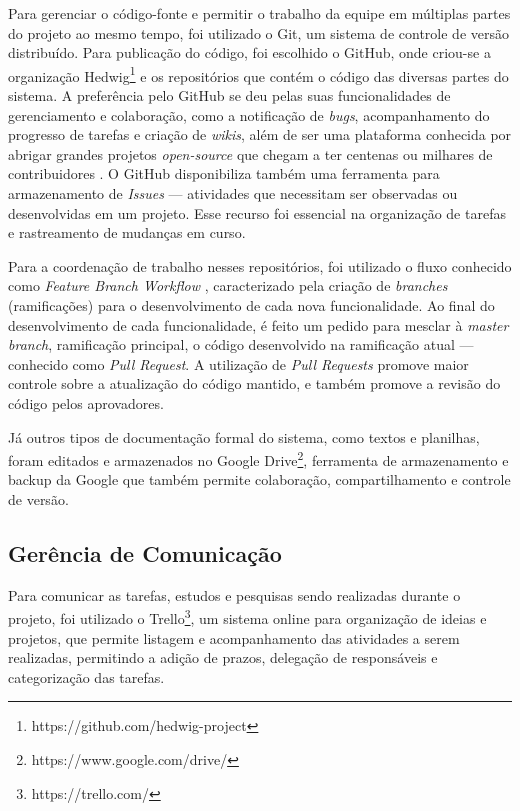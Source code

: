 Para gerenciar o código-fonte e permitir o trabalho da equipe em múltiplas partes do projeto ao mesmo tempo, foi utilizado o Git, um sistema de controle de versão distribuído. Para publicação do código, foi escolhido o GitHub, onde criou-se a organização Hedwig\footnote{https://github.com/hedwig-project} e os repositórios que contém o código das diversas partes do sistema. A preferência pelo GitHub se deu pelas suas funcionalidades de gerenciamento e colaboração, como a notificação de \emph{bugs}, acompanhamento do progresso de tarefas e criação de \textit{wikis}, além de ser uma plataforma conhecida por abrigar grandes projetos \emph{open-source} que chegam a ter centenas ou milhares de contribuidores \cite{github}. O GitHub disponibiliza também uma ferramenta para armazenamento de \emph{Issues} --- atividades que necessitam ser observadas ou desenvolvidas em um projeto. Esse recurso foi essencial na organização de tarefas e rastreamento de mudanças em curso.

Para a coordenação de trabalho nesses repositórios, foi utilizado o fluxo conhecido como \textit{Feature Branch Workflow} \cite{atlassian}, caracterizado pela criação de \textit{branches} (ramificações) para o desenvolvimento de cada nova funcionalidade. Ao final do desenvolvimento de cada funcionalidade, é feito um pedido para mesclar à \textit{master branch}, ramificação principal, o código desenvolvido na ramificação atual --- conhecido como \emph{Pull Request}. A utilização de \emph{Pull Requests} promove maior controle sobre a atualização do código mantido, e também promove a revisão do código pelos aprovadores. 

Já outros tipos de documentação formal do sistema, como textos e planilhas, foram editados e armazenados no Google Drive\footnote{https://www.google.com/drive/}, ferramenta de armazenamento e backup da Google que também permite colaboração, compartilhamento e controle de versão.

\subsection{Gerência de Comunicação}

Para comunicar as tarefas, estudos e pesquisas sendo realizadas durante o projeto, foi utilizado o Trello\footnote{https://trello.com/}, um sistema online para organização de ideias e projetos, que permite listagem e acompanhamento das atividades a serem realizadas, permitindo a adição de prazos, delegação de responsáveis e categorização das tarefas.

